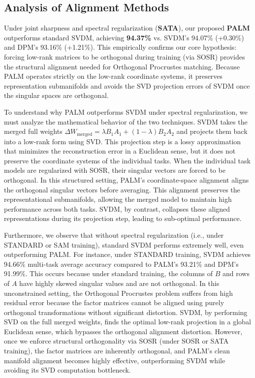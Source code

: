 \documentclass{article}
\theoremstyle{plain}
\theoremstyle{definition}
\theoremstyle{remark}
\begin{document}
\subsection{Analysis of Alignment Methods}
Under joint sharpness and spectral regularization (\textbf{SATA}), our proposed \textbf{PALM} outperforms standard SVDM, achieving \textbf{94.37\%} vs. SVDM's 94.07\% (+0.30\%) and DPM's 93.16\% (+1.21\%). This empirically confirms our core hypothesis: forcing low-rank matrices to be orthogonal during training (via SOSR) provides the structural alignment needed for Orthogonal Procrustes matching. Because PALM operates strictly on the low-rank coordinate systems, it preserves representation submanifolds and avoids the SVD projection errors of SVDM once the singular spaces are orthogonal.

To understand why PALM outperforms SVDM under spectral regularization, we must analyze the mathematical behavior of the two techniques. SVDM takes the merged full weights $\Delta W_{\text{merged}} = \lambda B_1 A_1 + (1-\lambda) B_2 A_2$ and projects them back into a low-rank form using SVD. This projection step is a lossy approximation that minimizes the reconstruction error in a Euclidean sense, but it does not preserve the coordinate systems of the individual tasks. When the individual task models are regularized with SOSR, their singular vectors are forced to be orthogonal. In this structured setting, PALM's coordinate-space alignment aligns the orthogonal singular vectors before averaging. This alignment preserves the representational submanifolds, allowing the merged model to maintain high performance across both tasks. SVDM, by contrast, collapses these aligned representations during its projection step, leading to sub-optimal performance.

Furthermore, we observe that without spectral regularization (i.e., under STANDARD or SAM training), standard SVDM performs extremely well, even outperforming PALM. For instance, under STANDARD training, SVDM achieves 94.66\% multi-task average accuracy compared to PALM's 93.21\% and DPM's 91.99\%. This occurs because under standard training, the columns of $B$ and rows of $A$ have highly skewed singular values and are not orthogonal. In this unconstrained setting, the Orthogonal Procrustes problem suffers from high residual error because the factor matrices cannot be aligned using purely orthogonal transformations without significant distortion. SVDM, by performing SVD on the full merged weights, finds the optimal low-rank projection in a global Euclidean sense, which bypasses the orthogonal alignment distortion. However, once we enforce structural orthogonality via SOSR (under SOSR or SATA training), the factor matrices are inherently orthogonal, and PALM's clean manifold alignment becomes highly effective, outperforming SVDM while avoiding its SVD computation bottleneck.
\end{document}
